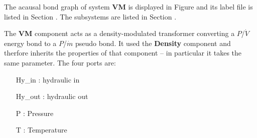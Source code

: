 

   The acausal bond graph of system \textbf{VM} is
   displayed in Figure  and its label
   file is listed in Section .
   The subsystems are listed in Section .

The \textbf{VM} component acts as a density-modulated transformer
converting a $P$/$\dot V$ energy bond to a $P$/$\dot m$ pseudo bond. It used
the \textbf{Density} component and therfore inherits the properties of
that component -- in particular it takes the same parameter. The four
ports are:

\begin{itemize}
\item [Hy_in]: hydraulic in
\item [Hy_out]: hydraulic out
\item [P]: Pressure
\item [T]: Temperature
\end{itemize}


